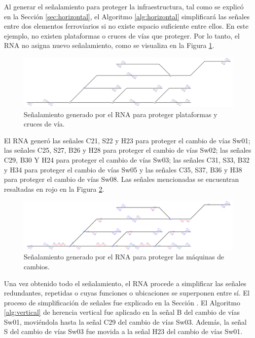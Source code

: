 	Al generar el señalamiento para proteger la infraestructura, tal como se explicó en la Sección \ref{sec:horizontal}, el Algoritmo \ref{alg:horizontal} simplificará las señales entre dos elementos ferroviarios si no existe espacio suficiente entre ellos. En este ejemplo, no existen plataformas o cruces de vías que proteger. Por lo tanto, el RNA no asigna nuevo señalamiento, como se visualiza en la Figura \ref{fig:EJ6_5}.

	\begin{figure}[H]
		\centering
		\includegraphics[width=1\textwidth]{resultados-obtenidos/ejemplo6/images/6_step3.png}
		\centering\caption{Señalamiento generado por el RNA para proteger plataformas y cruces de vía.}
		\label{fig:EJ6_5}
	\end{figure}

	El RNA generó las señales C21, S22 y H23 para proteger el cambio de vías Sw01; las señales C25, S27, B26 y H28 para proteger el cambio de vías Sw02; las señales C29, B30 Y H24 para proteger el cambio de vías Sw03; las señales C31, S33, B32 y H34 para proteger el cambio de vías Sw05 y las señales C35, S37, B36 y H38 para proteger el cambio de vías Sw08. Las señales mencionadas se encuentran resaltadas en rojo en la Figura \ref{fig:EJ6_6}.
	 \begin{figure}[H]
		\centering
		\includegraphics[width=1\textwidth]{resultados-obtenidos/ejemplo6/images/6_step4.png}
		\centering\caption{Señalamiento generado por el RNA para proteger las máquinas de cambios.}
		\label{fig:EJ6_6}
	\end{figure}
	
	Una vez obtenido todo el señalamiento, el RNA procede a simplificar las señales redundantes, repetidas o cuyas funciones o ubicaciones se superponen entre sí. El proceso de simplificación de señales fue explicado en la Sección \label{sec:simplificacion}. El Algoritmo \ref{alg:vertical} de herencia vertical fue aplicado en la señal B del cambio de vías Sw01, moviéndola hasta la señal C29 del cambio de vías Sw03. Además, la señal S del cambio de vías Sw03 fue movida a la señal H23 del cambio de vías Sw01.
	
